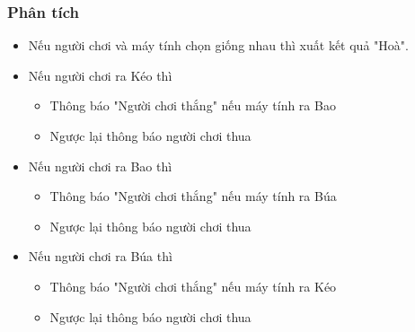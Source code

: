 \documentclass[a4paper]{article}
\begin{document}
\subsubsection{Phân tích}
\begin{itemize}
    \item Nếu người chơi và máy tính chọn giống nhau thì xuất kết quả "Hoà". 
    \item Nếu người chơi ra Kéo thì 
    \begin{itemize}
        \item Thông báo "Người chơi thắng" nếu máy tính ra Bao
        \item Ngược lại thông báo người chơi thua
    \end{itemize}
    \item Nếu người chơi ra Bao thì
    \begin{itemize}
        \item Thông báo "Người chơi thắng" nếu máy tính ra Búa
        \item Ngược lại thông báo người chơi thua
    \end{itemize}
    \item Nếu người chơi ra Búa thì
    \begin{itemize}
        \item Thông báo "Người chơi thắng" nếu máy tính ra Kéo
        \item Ngược lại thông báo người chơi thua
    \end{itemize}
\end{itemize}
\end{document}
